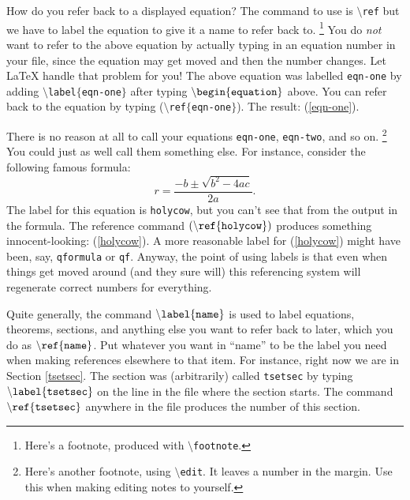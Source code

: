 \documentclass[12pt,letterpaper]{amsart}
\newcommand{\latex}{\LaTeX}
\newcommand{\sm}{\setminus}
\newcommand{\pln}[1]{$\sm${\tt #1}}
\newcommand{\bgn}[1]{$\tt {\sm}begin\{#1\}$}
\newcommand{\marginalfootnote}[1]{%
        \footnote{#1}
        \marginpar[\hfill{\sf\thefootnote}]{{\sf\thefootnote}}}
\newcommand{\edit}[1]{\marginalfootnote{#1}}
\theoremstyle{plain}
\theoremstyle{definition}
\numberwithin{equation}{section}
\begin{document}
How do you refer back to a displayed equation?  
The command to use is \pln{ref}
but we have to label the equation to give it 
a name to refer back to.
\footnote{Here's a footnote, produced with \pln{footnote}.}
You do {\it not} want to 
refer to the above equation by actually typing 
in an equation number in your file, since the equation may get moved
and then the number changes.  Let \latex{} handle that problem for you!
The above equation was labelled {\tt eqn-one} by adding 
{\tt $\sm$label$\{$eqn-one$\}$} after typing 
\bgn{equation} above.
You can refer back to the equation by typing 
(\pln{ref}$\{${\tt eqn-one}$\}$). The result: (\ref{eqn-one}).

There is no reason at all to call your equations {\tt eqn-one}, {\tt eqn-two}, 
and so on.
\edit{Here's another footnote, using 
\pln{edit}. It leaves a number 
in the margin.  Use this when making editing notes to yourself.}
You could just as well call them something else.  For instance, 
consider the following famous formula:
\begin{equation}\label{holycow} 
r = \frac{-b \pm \sqrt{b^2-4ac}}{2a}.
\end{equation}
The label for this equation is 
{\tt holycow}, but you can't see that from 
the output in the formula. 
The reference command 
$\tt ({\sm}ref\{holycow\})$ 
produces something innocent-looking: (\ref{holycow}). 
A more reasonable label for 
(\ref{holycow}) might have been, say, {\tt qformula} or {\tt qf}.
Anyway, the point of using labels is that even when things get moved around 
(and they sure will) this referencing system will regenerate 
correct numbers for everything. 

Quite generally, the command $\tt {\sm}label\{name\}$ is used to 
label equations, theorems, sections, and anything else you 
want to refer back to later, which you do as $\tt {\sm}ref\{name\}$.
Put whatever you want in ``name'' to be the label you need 
when making references elsewhere to that item.
For instance, right now we are in Section \ref{tsetsec}. 
The section was (arbitrarily) called {\tt tsetsec} by 
typing $\tt {\sm}label\{tsetsec\}$ on the line in the file where 
the section starts. 
The command $\tt {\sm}ref\{tsetsec\}$ anywhere in the file 
produces the number of this section.
\end{document}
